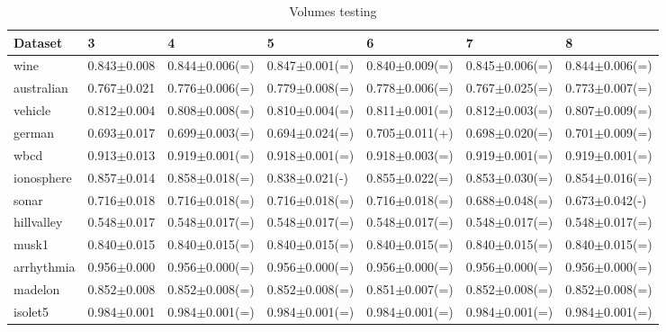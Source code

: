 \documentclass{report}
\begin{document}
\begin{table}
\centering
\scriptsize
\begin{tabular}{lllllll}
\\\hline
Dataset & 3 & 4 & 5 & 6 & 7 & 8\\\hline
wine & 0.843$\pm$0.008 & 0.844$\pm$0.006(=) & 0.847$\pm$0.001(=) & 0.840$\pm$0.009(=) & 0.845$\pm$0.006(=) & 0.844$\pm$0.006(=)\\\hline
australian & 0.767$\pm$0.021 & 0.776$\pm$0.006(=) & 0.779$\pm$0.008(=) & 0.778$\pm$0.006(=) & 0.767$\pm$0.025(=) & 0.773$\pm$0.007(=)\\\hline
vehicle & 0.812$\pm$0.004 & 0.808$\pm$0.008(=) & 0.810$\pm$0.004(=) & 0.811$\pm$0.001(=) & 0.812$\pm$0.003(=) & 0.807$\pm$0.009(=)\\\hline
german & 0.693$\pm$0.017 & 0.699$\pm$0.003(=) & 0.694$\pm$0.024(=) & 0.705$\pm$0.011(+) & 0.698$\pm$0.020(=) & 0.701$\pm$0.009(=)\\\hline
wbcd & 0.913$\pm$0.013 & 0.919$\pm$0.001(=) & 0.918$\pm$0.001(=) & 0.918$\pm$0.003(=) & 0.919$\pm$0.001(=) & 0.919$\pm$0.001(=)\\\hline
ionosphere & 0.857$\pm$0.014 & 0.858$\pm$0.018(=) & 0.838$\pm$0.021(-) & 0.855$\pm$0.022(=) & 0.853$\pm$0.030(=) & 0.854$\pm$0.016(=)\\\hline
sonar & 0.716$\pm$0.018 & 0.716$\pm$0.018(=) & 0.716$\pm$0.018(=) & 0.716$\pm$0.018(=) & 0.688$\pm$0.048(=) & 0.673$\pm$0.042(-)\\\hline
hillvalley & 0.548$\pm$0.017 & 0.548$\pm$0.017(=) & 0.548$\pm$0.017(=) & 0.548$\pm$0.017(=) & 0.548$\pm$0.017(=) & 0.548$\pm$0.017(=)\\\hline
musk1 & 0.840$\pm$0.015 & 0.840$\pm$0.015(=) & 0.840$\pm$0.015(=) & 0.840$\pm$0.015(=) & 0.840$\pm$0.015(=) & 0.840$\pm$0.015(=)\\\hline
arrhythmia & 0.956$\pm$0.000 & 0.956$\pm$0.000(=) & 0.956$\pm$0.000(=) & 0.956$\pm$0.000(=) & 0.956$\pm$0.000(=) & 0.956$\pm$0.000(=)\\\hline
madelon & 0.852$\pm$0.008 & 0.852$\pm$0.008(=) & 0.852$\pm$0.008(=) & 0.851$\pm$0.007(=) & 0.852$\pm$0.008(=) & 0.852$\pm$0.008(=)\\\hline
isolet5 & 0.984$\pm$0.001 & 0.984$\pm$0.001(=) & 0.984$\pm$0.001(=) & 0.984$\pm$0.001(=) & 0.984$\pm$0.001(=) & 0.984$\pm$0.001(=)\\\hline
\end{tabular}
\caption{Volumes testing}
\end{table}
\end{document}
